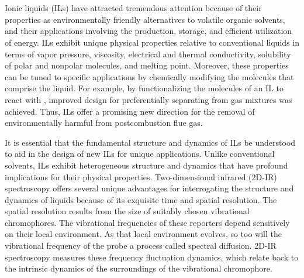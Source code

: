 \documentclass[%
  class = book,%
  crop = false,%
  float = true,%
  multi = true,%
  preview = false,%
]{standalone}
\begin{document}
\section{\texorpdfstring{}{Introduction}}
\label{paper_03:sec:I}

Ionic liquids (ILs) have attracted tremendous attention because of their properties as environmentally friendly alternatives to volatile organic solvents, and their applications involving the production, storage, and efficient utilization of energy.\cite{Karadas2010,wishartEES-09,Armand2009,Patel2012,baraACR-10} ILs exhibit unique physical properties relative to conventional liquids in terms of vapor pressure, viscosity, electrical and thermal conductivity, solubility of polar and nonpolar molecules, and melting point.\cite{baraACR-10,Crosthwaite2005,seki_effects_2010,Tokuda2005,anthonyJPCB-02} Moreover, these properties can be tuned to specific applications by chemically modifying the molecules that comprise the liquid. For example, by functionalizing the molecules of an IL to react with , improved design for preferentially separating  from gas mixtures was achieved.\cite{anthonyJPCB-02,seoJPCB-14,shiflett_solubilities_2005,Gurkan2010,Cadena2004} Thus, ILs offer a promising new direction for the removal of environmentally harmful  from postcombustion flue gas.

It is essential that the fundamental structure and dynamics of ILs be understood to aid in the design of new ILs for unique applications.  Unlike conventional solvents, ILs exhibit heterogeneous structure and dynamics that have profound implications for their physical properties.  Two-dimensional infrared (2D-IR) spectroscopy offers several unique advantages for interrogating the structure and dynamics of liquids because of its exquisite time and spatial resolution.\cite{Tamimi2016b,Ren2014,hamm_concepts_2011,khalil_coherent_2003} The spatial resolution results from the size of suitably chosen vibrational chromophores. The vibrational frequencies of these reporters depend sensitively on their local environment.\cite{Ren2014,levinson_phosphate_2011,choi_vibrational_2011,choiJCP-08,Lee2011,steinelCPL-04} As that local environment evolves, so too will the vibrational frequency of the probe \textemdash{} a process called spectral diffusion. 2D-IR spectroscopy measures these frequency fluctuation dynamics, which relate back to the intrinsic dynamics of the surroundings of the vibrational chromophore.
\end{document}
